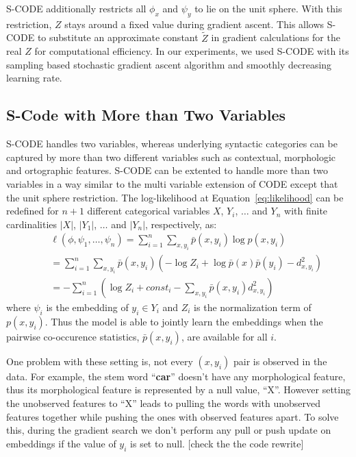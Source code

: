 S-CODE \cite{maron2010sphere} additionally restricts all $\phi_x$ and
$\psi_y$ to lie on the unit sphere.  With this restriction, $Z$ stays
around a fixed value during gradient ascent.  This allows S-CODE to
substitute an approximate constant $\tilde{Z}$ in gradient
calculations for the real $Z$ for computational efficiency.  In our
experiments, we used S-CODE with its sampling based stochastic
gradient ascent algorithm and smoothly decreasing learning
rate.

\subsection{S-Code with More than Two Variables}

S-CODE handles two variables, whereas underlying syntactic categories
can be captured by more than two different variables such as
contextual, morphologic and ortographic features.  S-CODE can be
extented to handle more than two variables in a way similar to the
multi variable extension of CODE \cite{globerson2007euclidean} except
that the unit sphere restriction.  The log-likelihood at
Equation~\ref{eq:likelihood} can be redefined for $n+1$ different
categorical variables $X$, $Y_i$, $\hdots$ and $Y_n$ with finite
cardinalities $|X|$, $|Y_1|$, $\hdots$ and $|Y_n|$, respectively, as:
\begin{eqnarray}
&&\ell(\phi, \psi_1,\hdots,\psi_n) = \sum_{i=1}^n\sum_{x,y_i} \bar{p}(x,y_i) \log p(x,y_i) \label{eq:multilikelihood} \\
&&= \sum_{i=1}^n\sum_{x,y_i} \bar{p}(x,y_i) (-\log Z_i + \log \bar{p}(x)\bar{p}(y_i) - d^2_{x,y_i}) \nonumber \\
&&=-\sum_{i=1}^n(\log Z_i + \mathit{const}_i - \sum_{x,y_i} \bar{p}(x,y_i) d^2_{x,y_i}) \nonumber
\end{eqnarray}
where $\psi_i$ is the embedding of $y_i \in Y_i$ and $Z_i$ is the
normalization term of $p(x,y_i)$.  Thus the model is able to
jointly learn the embeddings when the pairwise co-occurence statistics,
$\bar{p}(x,y_i)$, are available for all $i$.

One problem with these setting is, not every $(x,y_i)$ pair is
observed in the data.  For example, the stem word ``\textbf{car}''
doesn't have any morphological feature, thus its morphological feature
is represented by a null value, ``X''.  However setting the unobserved
features to ``X'' leads to pulling the words with unobserved features
together while pushing the ones with observed features apart.  To
solve this, during the gradient search we don't perform any pull or
push update on embeddings if the value of $y_i$ is set to null. [check the
  the code rewrite]

